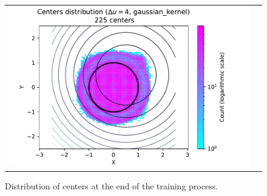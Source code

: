 \documentclass[12pt]{report} %
\begin{document}
\begin{figure}[h]
\begin{tabular}{cc}
    \includegraphics[width=.6\textwidth]{imagenes/experiments/2d/pde_parabola/circle_c225_pde_gaussian_kernel.pdf}
  \end{tabular}
  \caption{Distribution of centers at the end of the training process.}
  \label{fig:2d-pde-results-centers}
\end{figure}







\clearpage


\printbibliography




\end{document}
